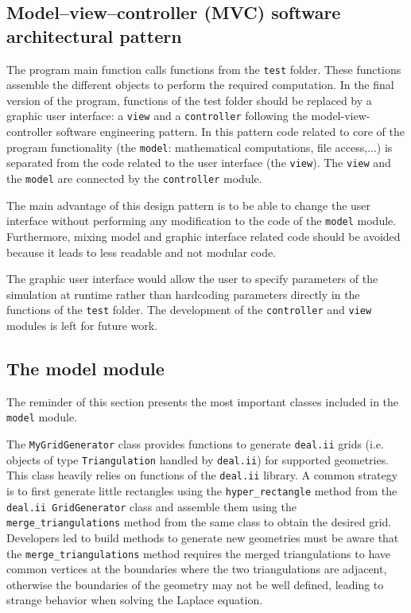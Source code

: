 \documentclass[11pt]{article}
\begin{document}
	\subsection{Model–view–controller (MVC) software architectural pattern}

		The program main function calls functions from the \texttt{test} folder. These functions
		assemble the different objects to perform the required computation. In the
		final version of the program, functions of the test folder should be replaced
		by a graphic user interface: a \texttt{view} and a \texttt{controller} following
		the model-view-controller software engineering pattern. In this pattern code
		related to core of the program functionality (the \texttt{model}: mathematical computations, file access,...)
		is separated from the code related to the user interface (the \texttt{view}).
		The \texttt{view} and the
		\texttt{model} are connected by the \texttt{controller} module.

		The main advantage of this design pattern is to be able to change the user interface without
		performing any modification to the code of the \texttt{model} module. Furthermore,
		mixing model and graphic interface related code should be avoided because it leads to
		less readable and not modular code.

		The graphic user interface would allow the user to specify
		parameters of the simulation at runtime rather than hardcoding parameters
		directly in the functions of the \texttt{test} folder.
		The development of the \texttt{controller} and \texttt{view} modules
		is left for future work.

	\subsection{The model module}

		The reminder of this section presents the most important classes
		included in the \texttt{model} module.



		The \texttt{MyGridGenerator} class provides functions to generate \texttt{deal.ii}
		grids (i.e. objects of type \texttt{Triangulation} handled by \texttt{deal.ii}) for supported
		geometries. This class heavily relies on functions of the \texttt{deal.ii}
		library. A common strategy is to first generate
		little rectangles using the \lstinline{hyper_rectangle} method from the
		\texttt{deal.ii GridGenerator} class and assemble them using the \lstinline{merge_triangulations}
		method from the same class to obtain the desired grid. Developers led to build
		methods to generate
		new geometries must be aware that the \lstinline{merge_triangulations} method
		requires the merged triangulations to have common vertices at the boundaries
		where the two triangulations are adjacent, otherwise
		the boundaries of the geometry may not be well defined, leading to strange behavior
		when solving the Laplace equation.
\end{document}
